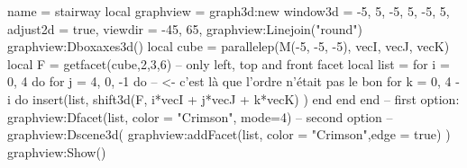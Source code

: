 \documentclass[border = 3pt]{standalone}
\begin{document}
\begin{luadraw}{name = stairway}
    local graphview = graph3d:new{
        window3d = {-5, 5, -5, 5, -5, 5},
        adjust2d = true,
        viewdir  = {-45, 65},
    }
    graphview:Linejoin("round")
    graphview:Dboxaxes3d()
    local cube = parallelep(M(-5, -5, -5), vecI, vecJ, vecK)
    local F = getfacet(cube,{2,3,6}) -- only left, top and front facet
    local list = {}
    for i = 0, 4 do
        for j = 4, 0, -1 do -- <- c'est là que l'ordre n'était pas le bon
            for k = 0, 4 - i do 
                insert(list, shift3d(F, i*vecI + j*vecJ + k*vecK) )   
            end
        end
    end
    -- first option:
    graphview:Dfacet(list, {color = "Crimson", mode=4})
    -- second option
    --graphview:Dscene3d( graphview:addFacet(list, {color = "Crimson",edge = true}) )
    graphview:Show()
\end{luadraw}
\end{document}
